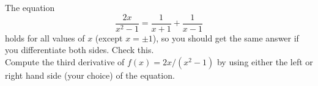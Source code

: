 The equation 
\begin{equation*}
  \frac{2x}{x^2-1}= \frac{1}{x+1}+\frac{1}{x-1}
\end{equation*}
holds for all values of $x$ (except $x=\pm1$), so you should get
the same answer if you differentiate both sides.  Check this.\\

Compute the third derivative of $f(x) = 2x/(x^2-1)$ by using either the
left or right hand side (your choice) of the equation.\answercheck
